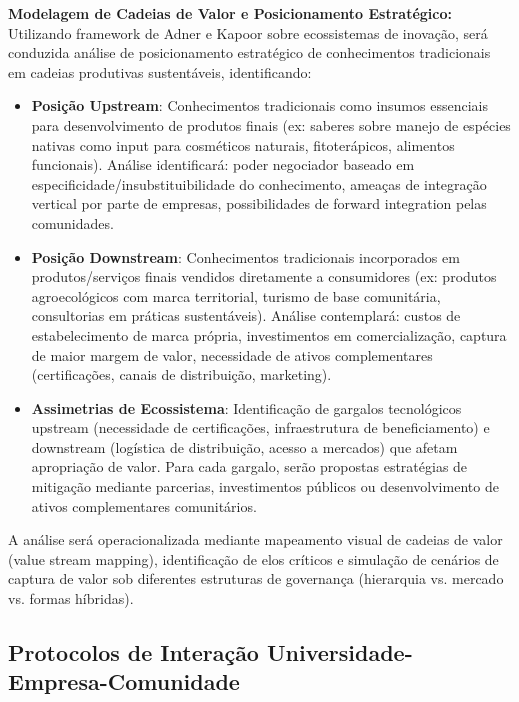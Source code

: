 \textbf{Modelagem de Cadeias de Valor e Posicionamento Estratégico:} Utilizando framework de Adner e Kapoor \cite{AdnerKapoor2010} sobre ecossistemas de inovação, será conduzida análise de posicionamento estratégico de conhecimentos tradicionais em cadeias produtivas sustentáveis, identificando:

\begin{itemize}
\item \textbf{Posição Upstream}: Conhecimentos tradicionais como insumos essenciais para desenvolvimento de produtos finais (ex: saberes sobre manejo de espécies nativas como input para cosméticos naturais, fitoterápicos, alimentos funcionais). Análise identificará: poder negociador baseado em especificidade/insubstituibilidade do conhecimento, ameaças de integração vertical por parte de empresas, possibilidades de forward integration pelas comunidades.

\item \textbf{Posição Downstream}: Conhecimentos tradicionais incorporados em produtos/serviços finais vendidos diretamente a consumidores (ex: produtos agroecológicos com marca territorial, turismo de base comunitária, consultorias em práticas sustentáveis). Análise contemplará: custos de estabelecimento de marca própria, investimentos em comercialização, captura de maior margem de valor, necessidade de ativos complementares (certificações, canais de distribuição, marketing).

\item \textbf{Assimetrias de Ecossistema}: Identificação de gargalos tecnológicos upstream (necessidade de certificações, infraestrutura de beneficiamento) e downstream (logística de distribuição, acesso a mercados) que afetam apropriação de valor. Para cada gargalo, serão propostas estratégias de mitigação mediante parcerias, investimentos públicos ou desenvolvimento de ativos complementares comunitários.
\end{itemize}

A análise será operacionalizada mediante mapeamento visual de cadeias de valor (value stream mapping), identificação de elos críticos e simulação de cenários de captura de valor sob diferentes estruturas de governança (hierarquia vs. mercado vs. formas híbridas).

\subsection{Protocolos de Interação Universidade-Empresa-Comunidade}

